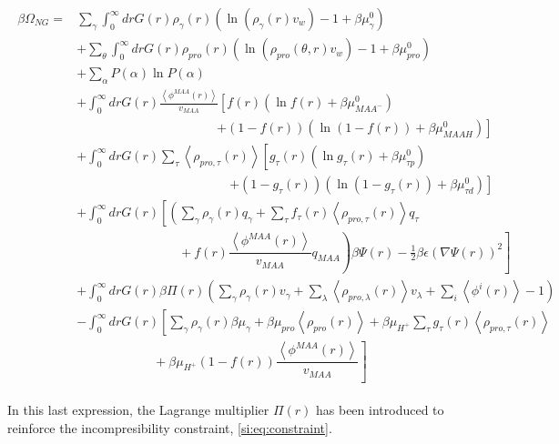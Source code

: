\documentclass[journal=jacsat,manuscript=suppinfo]{achemso}
\begin{document}
\begin{align}
	\begin{aligned}
		\beta\Omega_{NG}=&  \sum_{\gamma}\int_0^\infty{dr G(r)\rho_\gamma(r)\left(\ln \left(\rho_\gamma (r)v_w\right) -1 + \beta\mu^0_\gamma\right)} \\
		& +\sum_\theta \int_0^\infty{dr G(r)\rho_{pro}(r)\left(\ln (\rho_{pro}(\theta,r)v_w)-1 + \beta\mu^0_{pro} \right)} \\
		& + \sum_{\alpha}{P(\alpha)\ln P(\alpha)} \\
		& +\int_0^\infty drG(r) \frac{\left<\phi^{MAA}(r)\right>}{v_{MAA}} \left[f(r)(\ln f(r)+ \beta\mu^0_{MAA^-})\right.\\
		&\qquad \qquad \qquad\qquad \qquad \quad \left.+(1-f(r))(\ln (1-f(r))+\beta\mu^0_{MAAH})\right] \\
		& +\int_0^\infty drG(r)\sum_\tau \left<\rho_{pro,\tau}(r)\right> \left[g_\tau(r)(\ln g_\tau(r)+ \beta\mu^0_{\tau p})\right.\\
		&\qquad\qquad \qquad\qquad \qquad \qquad\left.+(1-g_\tau(r))(\ln (1-g_\tau(r))+\beta\mu^0_{\tau d})\right] \\
		& +  \int_0^\infty drG(r)\left[\left(\sum_{\gamma } \rho_\gamma(r) q_\gamma + \sum_\tau{f_\tau(r) \left<\rho_{pro,\tau}(r)\right> q_\tau} \right. \right. \\ 
		& \left. \left. \hspace{8em}+  f(r)\dfrac{\left<\phi^{MAA}(r)\right>}{v_{MAA}}q_{MAA}\right)\beta\Psi(r)  -\frac{1}{2}\beta\epsilon(\nabla\Psi(r))^2 \right]\\
		&+ \int_0^\infty drG(r)  \beta\Pi(r){\left(\sum_{\gamma}\rho_\gamma(r) v_\gamma + \sum_{\lambda}{\left<\rho_{pro,\lambda}(r)\right>}{v_\lambda} + \sum_i\left<\phi^i(r)\right> -1\right)}\\
		& -\int_0^\infty drG(r)\left[\sum_{\gamma }{\rho_\gamma(r)\beta\mu_\gamma}
		+ \beta\mu_{pro} \left<\rho_{pro}(r)\right>
		+\beta\mu_{H^+}\sum_{\tau}{g_\tau(r)\left<\rho_{pro,\tau}(r)\right> } \right.\\
		& \left. \hspace{6em} +\beta\mu_{H^+}(1-f(r))\dfrac{\left<\phi^{MAA}(r)\right>}{v_{MAA}}\right]%
	\end{aligned}
	\label{eq:si:free-energy_expl}
\end{align}

In this last expression, the Lagrange multiplier $\Pi(r)$ has been introduced to reinforce the incompresibility constraint, \cref{si:eq:constraint}.
\end{document}
